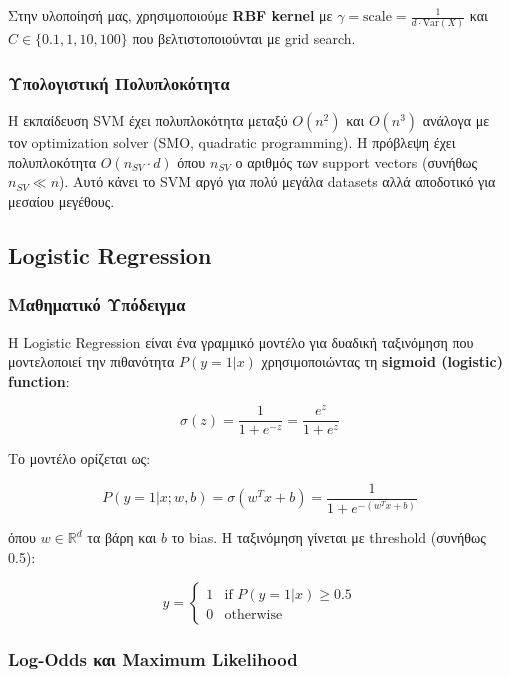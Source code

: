 \documentclass[12pt,a4paper,twoside]{book}
\begin{document}
Στην υλοποίησή μας, χρησιμοποιούμε \textbf{RBF kernel} με \(\gamma = \text{scale} = \frac{1}{d \cdot \text{Var}(X)}\) και \(C \in \{0.1, 1, 10, 100\}\) που βελτιστοποιούνται με grid search.

\subsubsection*{Υπολογιστική Πολυπλοκότητα}

Η εκπαίδευση SVM έχει πολυπλοκότητα μεταξύ \(O(n^2)\) και \(O(n^3)\) ανάλογα με τον optimization solver (SMO, quadratic programming). Η πρόβλεψη έχει πολυπλοκότητα \(O(n_{SV} \cdot d)\) όπου \(n_{SV}\) ο αριθμός των support vectors (συνήθως \(n_{SV} \ll n\)). Αυτό κάνει το SVM αργό για πολύ μεγάλα datasets αλλά αποδοτικό για μεσαίου μεγέθους.
\subsection{Logistic Regression}

\subsubsection{Μαθηματικό Υπόδειγμα}

Η Logistic Regression είναι ένα γραμμικό μοντέλο για δυαδική ταξινόμηση που μοντελοποιεί την πιθανότητα \(P(y=1|x)\) χρησιμοποιώντας τη \textbf{sigmoid (logistic) function}:

\begin{equation}
    \sigma(z) = \frac{1}{1 + e^{-z}} = \frac{e^z}{1 + e^z}
\end{equation}

Το μοντέλο ορίζεται ως:

\begin{equation}
    P(y=1|x; w, b) = \sigma(w^T x + b) = \frac{1}{1 + e^{-(w^T x + b)}}
\end{equation}

όπου \(w \in \mathbb{R}^d\) τα βάρη και \(b\) το bias. Η ταξινόμηση γίνεται με threshold (συνήθως 0.5):

\begin{equation}
    \hat{y} = \begin{cases}
        1 & \text{if } P(y=1|x) \geq 0.5 \\
        0 & \text{otherwise}
    \end{cases}
\end{equation}

\subsubsection*{Log-Odds και Maximum Likelihood}
\end{document}
